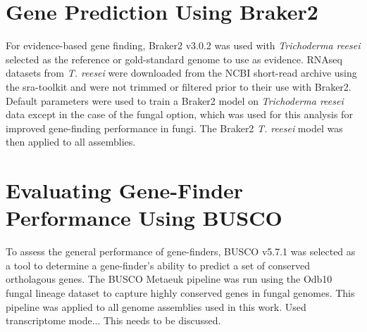 %

\section{Gene Prediction Using Braker2}

For evidence-based gene finding, Braker2 v3.0.2\cite{Bruna2021} was
used with \textit{Trichoderma reesei} selected as the reference or
gold-standard genome to use as evidence. RNAseq datasets from
\textit{T. reesei} were downloaded from the NCBI short-read archive
using the sra-toolkit\cite{NCBI2025} and were not trimmed or filtered
prior to their use with Braker2. Default parameters were used to train
a Braker2 model on \textit{Trichoderma reesei} data except in the case
of the fungal option, which was used for this analysis for improved
gene-finding performance in fungi. The Braker2 \textit{T. reesei}
model was then applied to all assemblies.


\section{Evaluating Gene-Finder Performance Using BUSCO}

To assess the general performance of gene-finders, BUSCO
v5.7.1\cite{10.1093/bioinformatics/btv351} was selected as a tool to
determine a gene-finder's ability to predict a set of conserved
ortholagous genes. The BUSCO Metaeuk pipeline was run using the Odb10
fungal lineage dataset to capture highly conserved genes in fungal
genomes. This pipeline was applied to all genome assemblies used in
this work. Used transcriptome mode... This needs to be discussed.


